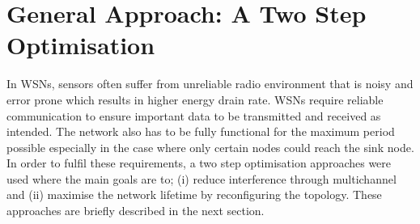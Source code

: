 \section{General Approach: A Two Step Optimisation}
\label{ProblemFormulation}

In WSNs, sensors often suffer from unreliable radio environment that is noisy and error prone which results in higher energy drain rate. 
WSNs require reliable communication to ensure important data to be transmitted and received as intended.
The network also has to be fully functional for the maximum period possible especially in the case where only certain nodes could reach the sink node.
In order to fulfil these requirements, a two step optimisation approaches were used where the main goals are to;
(i) reduce interference through multichannel and (ii) maximise the network lifetime by reconfiguring the topology. These approaches are briefly described in the next section.





